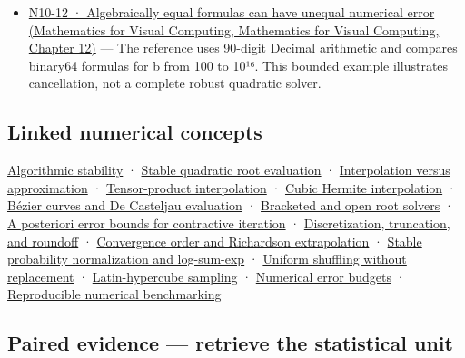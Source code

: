 \begin{itemize}
\item
  \href{../02-Mathematics-for-Visual-Computing/main.pdf\#nameddest=02-foundations-ii-ch028-figure-n10-12-algebraically-equal-formulas-can-have-unequal-numerical-error}{N10-12 · Algebraically equal formulas can have unequal numerical error (Mathematics for Visual Computing, Mathematics for Visual Computing, Chapter 12)} --- The reference uses 90-digit Decimal arithmetic and compares binary64 formulas for b from 100 to 10¹⁶. This bounded example illustrates cancellation, not a complete robust quadratic solver.
\end{itemize}

\subsection{Linked numerical concepts}\label{appendix-cb5af353ef77-linked-numerical-concepts}

\hyperref[appendix-aa2bf0d79639]{Algorithmic stability} · \hyperref[appendix-b9afba7f63e5]{Stable quadratic root evaluation} · \hyperref[appendix-0c2a5f69851e]{Interpolation versus approximation} · \hyperref[appendix-0a09b6dfdc86]{Tensor-product interpolation} · \hyperref[appendix-db3aef8f2fd6]{Cubic Hermite interpolation} · \hyperref[appendix-ddbec701898c]{Bézier curves and De Casteljau evaluation} · \hyperref[appendix-f63eb850796d]{Bracketed and open root solvers} · \hyperref[appendix-d83b0ad1be7f]{A posteriori error bounds for contractive iteration} · \hyperref[appendix-6b0648b2b8e8]{Discretization, truncation, and roundoff} · \hyperref[appendix-aca80b6bf17a]{Convergence order and Richardson extrapolation} · \hyperref[appendix-d580b422240f]{Stable probability normalization and log-sum-exp} · \hyperref[appendix-184fcc411663]{Uniform shuffling without replacement} · \hyperref[appendix-1c5e85693a06]{Latin-hypercube sampling} · \hyperref[appendix-31b8c295e05f]{Numerical error budgets} · \hyperref[appendix-b9db93e28371]{Reproducible numerical benchmarking}

\subsection{Paired evidence --- retrieve the statistical unit}\label{appendix-cb5af353ef77-paired-evidence-retrieve-the-statistical-unit}

